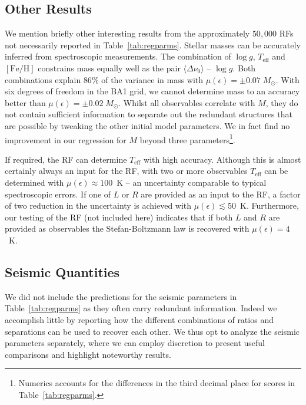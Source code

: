 \subsection{Other Results}
We mention briefly other interesting results from the approximately $50,000$ RFs not necessarily reported in Table~\ref{tab:regparms}.
Stellar masses can be accurately inferred from spectroscopic measurements. The combination of  ${\log{} g}$, $T_{\text{eff}}$ and $[\text{Fe/H}]$ constrains mass equally well as the pair ${\langle\Delta\nu_0\rangle}$ -- ${\log{} g}$. Both combinations explain 
 $86\%$ of the variance in mass with ${\mu (\epsilon) = \pm 0.07 \; M_{\odot}}$. With six degrees of freedom in the BA1 grid, we cannot determine mass to an accuracy better than  ${\mu (\epsilon) = \pm 0.02\;M_{\odot}}$.  
 Whilst all observables correlate with $M$, they do not contain sufficient information to separate out the redundant structures that are possible by tweaking the other initial model parameters. We in fact find no improvement in our regression for $M$ beyond three parameters\footnote{Numerics accounts for the differences in the third decimal place for scores in Table~\ref{tab:regparms}.}. 

If required, the RF can determine $T_{\text{eff}}$ with high accuracy. 
Although this is almost certainly always an input for the RF, with two or more observables $T_{\text{eff}}$ can be determined with  ${\mu (\epsilon) \approx 100}$~K -- an uncertainty comparable to typical spectroscopic errors. If one of $L$ or $R$ are provided as an input to the RF, a factor of two reduction in the uncertainty is achieved with ${\mu (\epsilon) \lesssim 50}$~K. Furthermore, our testing of the RF (not included here) indicates that if both $L$ and $R$ are provided as observables the Stefan-Boltzmann law is recovered with ${\mu (\epsilon) = 4}$~K. 
 


\subsection{Seismic Quantities} \label{sec:seispr}
We did not include the predictions for the seismic parameters in Table~\ref{tab:regparms} as they often carry redundant information. Indeed we accomplish little 
by reporting how the different combinations of ratios and separations can be used to recover each other. 
We thus opt to analyze the seismic parameters separately, where we can employ discretion to present useful comparisons and highlight noteworthy results. 

